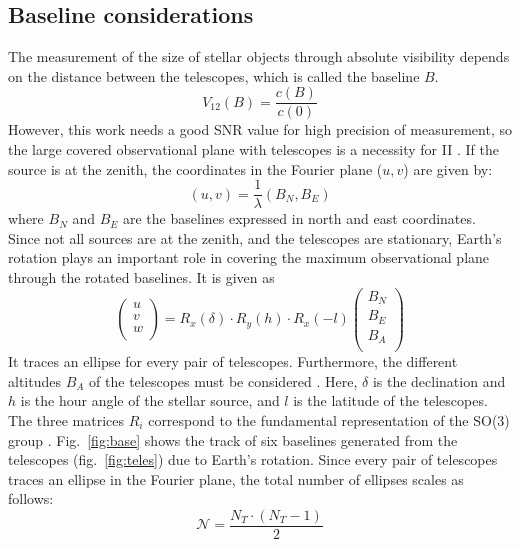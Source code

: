 \subsection{Baseline considerations}
The measurement of the size of stellar objects through absolute visibility depends on the distance between the telescopes, which is called the baseline $B$. 
\begin{equation}
	V_{12}(B) = \frac{c(B)}{c(0)}
	\label{eq:angular_size_meas}
\end{equation}
However, this work needs a good SNR value for high precision of measurement, so the large covered observational plane with telescopes is a necessity for II \citep{acciari2020optical, abeysekara2020demonstration}. If the source is at the zenith, the coordinates in the Fourier plane ($u,v$) are given by:
\begin{equation}
	(u,v) = \frac{1}{\lambda} (B_N, B_E)
\end{equation}
where $B_N$ and $B_E$ are the baselines expressed in north and east coordinates. Since not all sources are at the zenith, and the telescopes are stationary, Earth's rotation plays an important role in covering the maximum observational plane through the rotated baselines. It is given as  
\begin{equation}
	\begin{pmatrix} u\\ v\\ w\\ \end{pmatrix} = R_x(\delta) \cdot R_y(h) \cdot R_x(-l) \begin{pmatrix} B_N\\ B_E\\ B_A\\ \end{pmatrix}
	\label{eq:baseline_rot}
\end{equation}
It traces an ellipse for every pair of telescopes. Furthermore, the different altitudes $B_A$ of the telescopes must be considered \citep{dravins2013optical, saha2020theory}. Here, $\delta$ is the declination and $h$ is the hour angle of the stellar source, and $l$ is the latitude of the telescopes. The three matrices $R_i$ correspond to the fundamental representation of the SO(3) group \citep{saha2020theory}. Fig.~\ref{fig:base} shows the track of six baselines generated from the telescopes (fig.~\ref{fig:teles}) due to Earth's rotation. Since every pair of telescopes traces an ellipse in the Fourier plane, the total number of ellipses scales as follows:
\begin{equation}
	\label{eq:N_telescopes}
	\mathcal{N} = \frac{N_T \cdot (N_T -1)}{2}
\end{equation}

